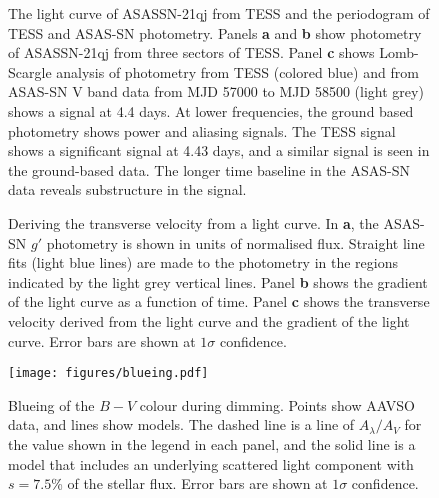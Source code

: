 \documentclass[sn-nature]{sn-jnl}%
\begin{document}
\begin{figure}
   \begin{centering}
      \caption{The light curve of ASASSN-21qj from TESS and the periodogram of TESS and ASAS-SN photometry.
      Panels {\bf a} and {\bf b} show photometry of ASASSN-21qj from three sectors of TESS.
      Panel {\bf c} shows Lomb-Scargle analysis of photometry from TESS (colored blue) and from ASAS-SN V band data from MJD 57000 to MJD 58500 (light grey) shows a signal at 4.4 days.
      At lower frequencies, the ground based photometry shows power and aliasing signals.
      The TESS signal shows a significant signal at 4.43 days, and a similar signal is seen in the ground-based data.
      The longer time baseline in the ASAS-SN data reveals substructure in the signal.}
        \label{fig:TESS_lc}
    \end{centering}
\end{figure}

\begin{figure*}
\begin{centering}
      \caption{Deriving the transverse velocity from a light curve.
      In {\bf a}, the ASAS-SN $g'$ photometry is shown in units of normalised flux.
      Straight line fits (light blue lines) are made to the photometry in the regions indicated by the light grey vertical lines.
      Panel {\bf b} shows the gradient of the light curve as a function of time.
      Panel {\bf c} shows the transverse velocity derived from the light curve and the gradient of the light curve.
      Error bars are shown at $1\sigma$ confidence.
}
        \label{fig:gradientconvert}
\end{centering}
\end{figure*}

\begin{figure}
    \centering
\texttt{[image: figures/blueing.pdf]}
    \caption{Blueing of the $B-V$ colour during dimming.
    Points show AAVSO data, and lines show models.
    The dashed line is a line of $A_\lambda/A_V$ for the value shown in the legend in each panel, and the solid line is a model that includes an underlying scattered light component with $s=7.5$\% of the stellar flux.
    Error bars are shown at $1\sigma$ confidence.
}
    \label{fig:blueing}
\end{figure}
\end{document}
